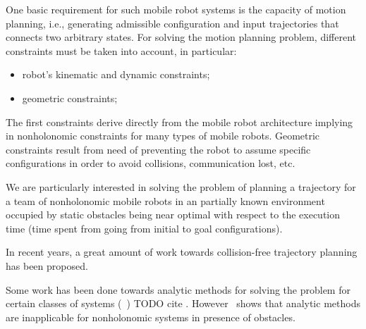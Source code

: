 \documentclass[eprint]{actapoly}
\begin{document}

One basic requirement for such mobile robot systems is the capacity of motion planning, i.e., generating admissible configuration and input trajectories that connects two arbitrary states. For solving the motion planning problem, different 
constraints must be taken into account, in particular:

\begin{itemize}

 \item robot's kinematic and dynamic constraints;

 \item geometric constraints;


\end{itemize}

The first constraints derive directly from the mobile robot architecture 
implying in nonholonomic constraints for many types of mobile robots. Geometric 
constraints result from need of preventing the robot to assume specific configurations in order to avoid collisions, communication lost, etc.


We are particularly interested in solving the problem of planning a 
trajectory for a team of nonholonomic mobile robots in an partially known 
environment occupied by static obstacles being near optimal with respect to the 
execution time (time spent from going from initial to goal configurations).

 


In recent years, a great amount of work towards collision-free trajectory 
planning has been proposed.

 

Some work has been done towards analytic methods for solving the problem for 
certain classes of systems (~\cite{})
TODO cite
. However~\cite{Schwartz1988} shows 
that analytic methods  are inapplicable for nonholonomic systems in presence of 
obstacles.
\end{document}
